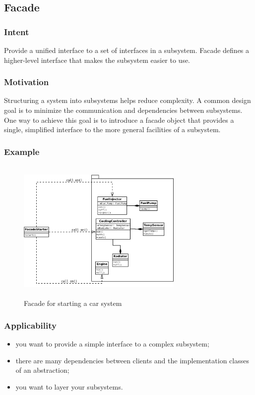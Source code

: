 \documentclass[10pt,xcolor={usenames,dvipsnames}]{beamer}
\begin{document}
\subsection{Facade}
\begin{frame}[fragile]
	\frametitle{Intent}
	\begin{exampleblock}{}
	Provide a unified interface to a set of interfaces in a subsystem. Facade defines a
	higher-level interface that makes the subsystem easier to use.
	\end{exampleblock}
\end{frame}

\begin{frame}[fragile]
	\frametitle{Motivation}
	\begin{exampleblock}{}
Structuring a system into subsystems helps reduce complexity. A common design goal is to minimize the communication and dependencies between subsystems. One way to achieve this goal is to introduce a facade object that provides a single, simplified interface to the more general facilities of a subsystem.
	\end{exampleblock}
\end{frame}

\begin{frame}[fragile]
	\frametitle{Example}
		\begin{figure}
			\includegraphics[height=7cm,width=8cm]{facade.png}
			\caption{Facade for starting a car system}
		\end{figure}
\end{frame}

\begin{frame}[fragile]
	\frametitle{Applicability}
	\begin{exampleblock}{}
		\begin{itemize}
			\item you want to provide a simple interface to a complex subsystem;
			\item there are many dependencies between clients and the implementation classes
of an abstraction;
			\item you want to layer your subsystems.
		\end{itemize}
	\end{exampleblock}
\end{frame}
\end{document}
